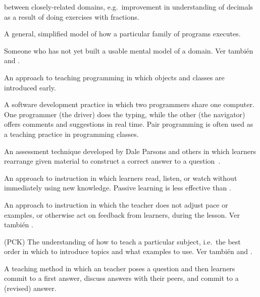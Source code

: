 \begin{description}
 
between closely-related domains, e.g.\ improvement in understanding of decimals
as a result of doing exercises with fractions.

 A general, simplified model of how
a particular family of programs executes.

 Someone who has not yet built a usable mental model of
a domain. Ver también 
and .

 An approach to teaching programming in
which objects and classes are introduced early.

 A software development practice in
which two programmers share one computer. One programmer (the driver) does the
typing, while the other (the navigator) offers comments and suggestions in real
time. Pair programming is often used as a teaching practice in programming
classes.

 An assessment technique developed by
Dale Parsons and others in which learners rearrange given material to construct
a correct answer to a question~\cite{Pars2006}.

 An approach to instruction in which
learners read, listen, or watch without immediately using new knowledge.
Passive learning is less effective than .

 An approach to instruction in which
the teacher does not adjust pace or examples, or otherwise act on feedback from
learners, during the lesson.  Ver también .

 (PCK)
The understanding of how to teach a particular subject, i.e.\ the best order in
which to introduce topics and what examples to use. Ver también
and .

 A teaching method in which an
teacher poses a question and then learners commit to a first answer, discuss
answers with their peers, and commit to a (revised) answer.


\end{description}
